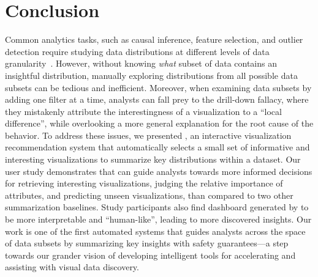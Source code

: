 \section{Conclusion}
\par Common analytics tasks, such as causal inference, feature selection, and outlier detection require studying data distributions at different levels of data granularity~\cite{Anand2015,Heer2012,Wu2013}. However, without knowing \textit{what} subset of data contains an insightful distribution, manually exploring distributions from all possible data subsets can be tedious and inefficient. Moreover, when examining data subsets by adding one filter at a time, analysts can fall prey to the drill-down fallacy, where they mistakenly attribute the interestingness of a visualization to a ``local difference'', while overlooking a more general explanation for the root cause of the behavior. To address these issues, we presented \system, an interactive visualization recommendation system that automatically selects a small set of informative and interesting visualizations to summarize key distributions within a dataset. Our user study demonstrates that \system can guide analysts towards more informed decisions for retrieving interesting visualizations, judging the relative importance of attributes, and predicting unseen visualizations, than compared to two other summarization baselines. Study participants also find dashboard generated by \system to be more interpretable and ``human-like'', leading to more discovered insights. Our work is one of the first automated systems that guides analysts across the space of data subsets by summarizing key insights with safety guarantees---a step towards our grander vision of developing intelligent tools for accelerating and assisting with visual data discovery.  
